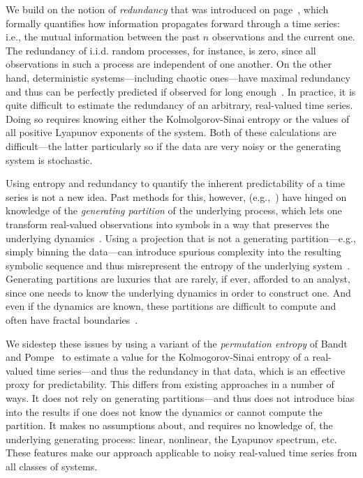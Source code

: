 We build on the notion of \emph{redundancy} that was introduced on
page~\pageref{page:redundancy}, which formally quantifies how
information propagates forward through a time series:
i.e., the mutual information between the past $n$ observations and the
current one.
% 
The redundancy of i.i.d. random processes, for instance, is zero,
since all observations in such a process are independent of one
another.  On the other hand, deterministic systems---including chaotic
ones---have maximal redundancy and thus can be perfectly predicted if
observed for long enough~\cite{weigend-book}.  In practice, it is
quite difficult to estimate the redundancy of an arbitrary,
real-valued time series.  Doing so requires knowing either the
Kolmolgorov-Sinai entropy or the values of all positive Lyapunov
exponents of the system.  Both of these calculations are
difficult---the latter particularly so if the data are very noisy or
the generating system is stochastic.

Using entropy and redundancy to quantify the inherent predictability
of a time series is not a new idea.  Past methods for this, however,
(e.g.,~\cite{Shannon1951, mantegna1994linguistic}) have hinged on
knowledge of the \emph{generating partition} of the underlying
process, which lets one transform real-valued observations into
symbols in a way that preserves the underlying dynamics~\cite{lind95}.
Using a projection that is not a generating partition---e.g., simply
binning the data---can introduce spurious complexity into the
resulting symbolic sequence and thus misrepresent the entropy of the
underlying system~\cite{bollt2001}.  Generating partitions are
luxuries that are rarely, if ever, afforded to an analyst, since one
needs to know the underlying dynamics in order to construct one.  And
even if the dynamics are known, these partitions are difficult to
compute and often have fractal boundaries~\cite{eisele1999}.

We sidestep these issues by using a variant of the \emph{permutation
  entropy} of Bandt and Pompe~\cite{bandt2002per} to estimate a value
for the Kolmogorov-Sinai entropy of a real-valued time series---and
thus the redundancy in that data, which is an effective proxy for
predictability.  This differs from existing approaches in a number of
ways.  It does not rely on generating partitions---and thus does not
introduce bias into the results if one does not know the dynamics or
cannot compute the partition.  It makes no assumptions about, and
requires no knowledge of, the underlying generating process: linear,
nonlinear, the Lyapunov spectrum, etc.  These features make our
approach applicable to noisy real-valued time series from all classes
of systems.

